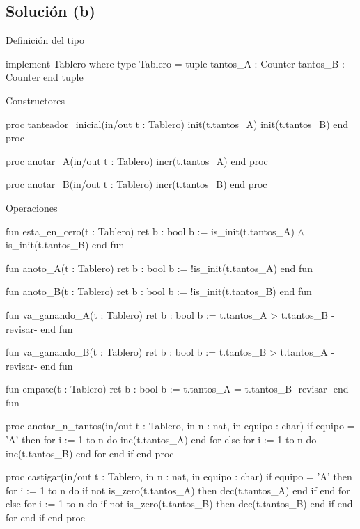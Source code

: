 \subsection{Solución (b)}
\begin{codebox}{Definición del tipo}
\begin{pascallike}
implement Tablero where
type Tablero = tuple
                  tantos_A : Counter
                  tantos_B : Counter
              end tuple
\end{pascallike}
\end{codebox}

\begin{codebox}{Constructores}
\begin{pascallike}
proc tanteador_inicial(in/out t : Tablero)
    init(t.tantos_A)
    init(t.tantos_B)
end proc

proc anotar_A(in/out t : Tablero)
    incr(t.tantos_A)
end proc

proc anotar_B(in/out t : Tablero)
    incr(t.tantos_B)
end proc
\end{pascallike}
\end{codebox}

\begin{codebox}{Operaciones}
\begin{pascallike}
fun esta_en_cero(t : Tablero) ret b : bool
    b := is_init(t.tantos_A) $\wedge$ is_init(t.tantos_B)
end fun

fun anoto_A(t : Tablero) ret b : bool
    b := !is_init(t.tantos_A)
end fun

fun anoto_B(t : Tablero) ret b : bool
    b := !is_init(t.tantos_B)
end fun

fun va_ganando_A(t : Tablero) ret b : bool
    b := t.tantos_A > t.tantos_B {-revisar-}
end fun

fun va_ganando_B(t : Tablero) ret b : bool
    b := t.tantos_B > t.tantos_A {-revisar-}
end fun

fun empate(t : Tablero) ret b : bool
    b := t.tantos_A = t.tantos_B {-revisar-}
end fun

proc anotar_n_tantos(in/out t : Tablero, in n : nat, in equipo : char)
    if equipo = 'A' then
        for i := 1 to n do
            inc(t.tantos_A)
        end for
    else
        for i := 1 to n do
            inc(t.tantos_B)
        end for
    end if
end proc

proc castigar(in/out t : Tablero, in n : nat, in equipo : char)
    if equipo = 'A' then
        for i := 1 to n do
            if not is_zero(t.tantos_A) then
                dec(t.tantos_A)
            end if
        end for
    else
        for i := 1 to n do
            if not is_zero(t.tantos_B) then
                dec(t.tantos_B)
            end if
        end for
    end if
end proc
\end{pascallike}
\end{codebox}

